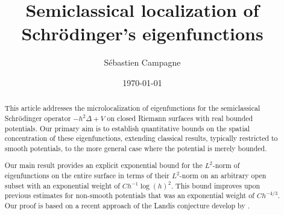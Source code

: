 \documentclass[leqno,11pt,letterpaper, english]{amsart}
\title[Semiclassical localization of Schrödinger's eigenfunctions]{Semiclassical localization of Schrödinger's eigenfunctions}
\author[S.~Campagne]{Sébastien Campagne}
\date{\today}
\theoremstyle{plain}
\theoremstyle{definition}
\numberwithin{equation}{section}
\begin{document}
    

\begin{abstract}
This article addresses the microlocalization of eigenfunctions for the semiclassical Schr\"odinger operator $-h^2\Delta+V$ on closed Riemann surfaces with real bounded potentials. Our primary aim is to establish quantitative bounds on the spatial concentration of these eigenfunctions, extending classical results, typically restricted to smooth potentials, to the more general case where the potential is merely bounded.


Our main result provides an explicit exponential bound for the $L^2$-norm of eigenfunctions on the entire surface in terms of their $L^2$-norm on an arbitrary open subset with an exponential weight of $Ch^{-1}\log(h)^2$. This bound improves upon previous estimates for non-smooth potentials that was an exponential weight of $Ch^{-4/3}$. Our proof is based  on a recent approach of the Landis conjecture develop by \cite*{logunov2020landisconjectureexponentialdecay}.
\end{abstract}

	
\end{document}
